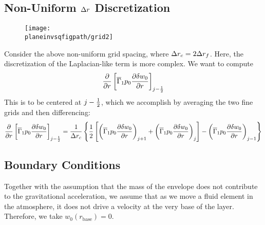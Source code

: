\subsection{Non-Uniform $\Delta r$ Discretization}

\begin{figure}[h]
\centering
\texttt{[image: \\planeinvsqfigpath/grid2]}
\end{figure}

Consider the above non-uniform grid spacing,
where $\Delta r_c = 2 \Delta r_f$.  Here, the discretization of the Laplacian-like term is more complex.
We want to compute
\begin{equation}
\frac{\partial}{\partial r} \left [ \overline{\Gamma}_1 p_0 \frac{\partial \delta w_0}{\partial r} \right ]_{j-\frac{1}{2}}
\end{equation}
This is to be centered at $j-\frac{1}{2}$, which we accomplish by averaging the two fine grids and then
differencing:
\begin{equation}
\frac{\partial}{\partial r} \left [ \overline{\Gamma}_1 p_0 \frac{\partial \delta w_0}{\partial r} \right ]_{j-\frac{1}{2}} =
\frac{1}{\Delta r_c} \left \{ \frac{1}{2} \left [
      \left ( \overline{\Gamma}_1 p_0 \frac{\partial \delta w_0}{\partial r} \right )_{j+1} +
      \left ( \overline{\Gamma}_1 p_0 \frac{\partial \delta w_0}{\partial r} \right )_{j} \right ]
   - \left ( \overline{\Gamma}_1 p_0 \frac{\partial \delta w_0}{\partial r} \right )_{j-1} 
\right \}
\end{equation}

\subsection{Boundary Conditions}

Together with the assumption that the mass of the envelope does not
contribute to the gravitational acceleration, we assume that as we move
a fluid element in the atmosphere, it does not drive a velocity at the very 
base of the layer.  Therefore, we take $w_0(r_\mathrm{base}) = 0$.



